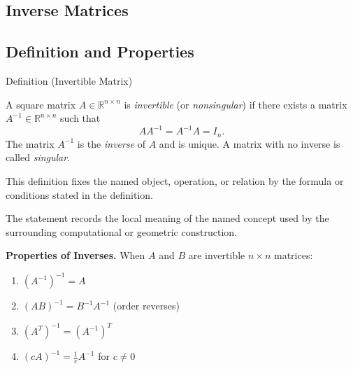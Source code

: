 
\subsection{Inverse Matrices}

\subsection*{Definition and Properties}

\begin{definitionbox}{Definition (Invertible Matrix)}
\begin{definition}
\label{def:invertible-matrix}
A square matrix $A \in \mathbb{R}^{n \times n}$ is \emph{invertible}
(or \emph{nonsingular}) if there exists a matrix $A^{-1} \in \mathbb{R}^{n \times n}$
such that
\[
  AA^{-1} = A^{-1}A = I_n.
\]
The matrix $A^{-1}$ is the \emph{inverse} of $A$ and is unique.
A matrix with no inverse is called \emph{singular}.
\end{definition}
\end{definitionbox}
\begin{remark*}
This definition fixes the named object, operation, or relation by the formula
or conditions stated in the definition.
\end{remark*}

\begin{remark*}[Interpretation]
The statement records the local meaning of the named concept used by the
surrounding computational or geometric construction.
\end{remark*}

\DefinitionalRoot

\begin{remark*}[Exposition]
\textbf{Properties of Inverses.}
When $A$ and $B$ are invertible $n \times n$ matrices:
\begin{enumerate}
  \item $(A^{-1})^{-1} = A$
  \item $(AB)^{-1} = B^{-1}A^{-1}$ \quad (order reverses)
  \item $(A^T)^{-1} = (A^{-1})^T$
  \item $(cA)^{-1} = \tfrac{1}{c} A^{-1}$ for $c \neq 0$
\end{enumerate}
\end{remark*}

